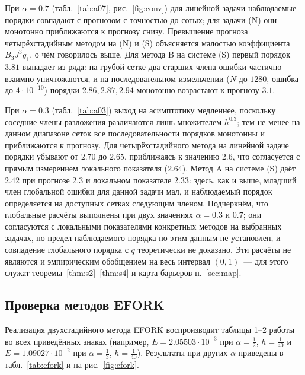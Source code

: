 \documentclass[11pt,a4paper]{article}
\theoremstyle{plain}
\theoremstyle{definition}
\begin{document}
При $\alpha=0.7$ (табл.~\ref{tab:a07}, рис.~\ref{fig:conv}) для линейной задачи наблюдаемые порядки совпадают с прогнозом с точностью до сотых; для задачи (N) они монотонно приближаются к прогнозу снизу. Превышение прогноза четырёхстадийным методом на (N) и (S) объясняется малостью коэффициента $B_3J^3g_1$, о чём говорилось выше. Для метода B на системе (S) первый порядок $3.81$ выпадает из ряда: на грубой сетке два старших члена ошибки частично взаимно уничтожаются, и на последовательном измельчении ($N$ до $1280$, ошибка до $4\cdot10^{-10}$) порядки $2.86, 2.87, 2.94$ монотонно возрастают к прогнозу $3.1$.

При $\alpha=0.3$ (табл.~\ref{tab:a03}) выход на асимптотику медленнее, поскольку соседние члены разложения различаются лишь множителем $h^{0.3}$; тем не менее на данном диапазоне сеток все последовательности порядков монотонны и приближаются к прогнозу. Для четырёхстадийного метода на линейной задаче порядки убывают от $2.70$ до $2.65$, приближаясь к значению $2.6$, что согласуется с прямым измерением локального показателя ($2.64$). Метод A на системе (S) даёт $2.42$ при прогнозе $2.3$ и локальном показателе $2.33$: здесь, как и выше, младший член глобальной ошибки для данной задачи мал, и наблюдаемый порядок определяется на доступных сетках следующим членом. Подчеркнём, что глобальные расчёты выполнены при двух значениях $\alpha=0.3$ и $0.7$; они согласуются с локальными показателями конкретных методов на выбранных задачах, но предел наблюдаемого порядка по этим данным не установлен, и совпадение глобального порядка с $q$ теоретически не доказано. Эти расчёты не являются и эмпирическим обобщением на весь интервал $(0,1)$~--- для этого служат теоремы~\ref{thm:s2}--\ref{thm:s4} и карта барьеров п.~\ref{sec:map}.

\subsection{Проверка методов EFORK}\label{sec:eforkcheck}

Реализация двухстадийного метода EFORK воспроизводит таблицы 1--2 работы~\cite{Ghaffari2023} во всех приведённых знаках (например, $E=2.05503\cdot10^{-3}$ при $\alpha=\frac12$, $h=\frac1{40}$ и $E=1.09027\cdot10^{-2}$ при $\alpha=\frac13$, $h=\frac1{40}$). Результаты при других $\alpha$ приведены в табл.~\ref{tab:efork} и на рис.~\ref{fig:efork}.
\end{document}
